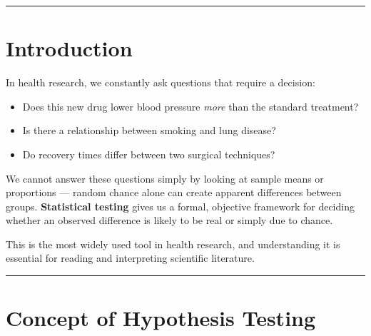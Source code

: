 \documentclass[
  12pt,
  letterpaper,
]{book}
\providecommand{\tightlist}{%
  \setlength{\itemsep}{0pt}\setlength{\parskip}{0pt}}
\begin{document}
\begin{center}\rule{0.5\linewidth}{0.5pt}\end{center}


\chapter*{Introduction}\label{introduction-4}


\begin{tcolorbox}[enhanced jigsaw, arc=.35mm, bottomrule=.15mm, bottomtitle=1mm, breakable, colback=white, colbacktitle=quarto-callout-note-color!10!white, colframe=quarto-callout-note-color-frame, coltitle=black, left=2mm, leftrule=.75mm, opacityback=0, opacitybacktitle=0.6, rightrule=.15mm, title={💡 Why Does This Matter?}, titlerule=0mm, toprule=.15mm, toptitle=1mm]

In health research, we constantly ask questions that require a decision:

\begin{itemize}
\tightlist
\item
  Does this new drug lower blood pressure \emph{more} than the standard
  treatment?
\item
  Is there a relationship between smoking and lung disease?
\item
  Do recovery times differ between two surgical techniques?
\end{itemize}

We cannot answer these questions simply by looking at sample means or
proportions --- random chance alone can create apparent differences
between groups. \textbf{Statistical testing} gives us a formal,
objective framework for deciding whether an observed difference is
likely to be real or simply due to chance.

This is the most widely used tool in health research, and understanding
it is essential for reading and interpreting scientific literature.

\end{tcolorbox}

\begin{center}\rule{0.5\linewidth}{0.5pt}\end{center}


\chapter{Concept of Hypothesis
Testing}\label{concept-of-hypothesis-testing}
\end{document}
